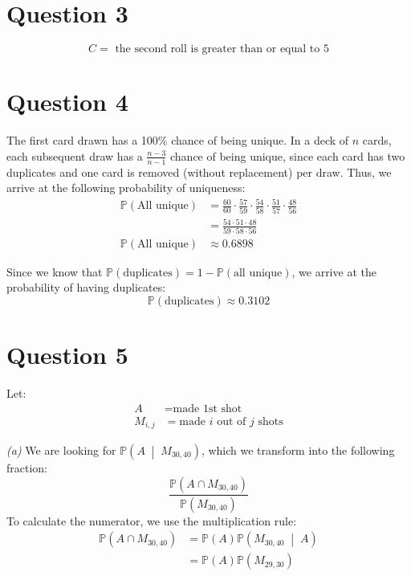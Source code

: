 \documentclass[titlepage, 12pt, leqno]{article}
\begin{document}
\pagebreak
\section{Question 3}
\[
    \boxed{C = \text{ the second roll is greater than or equal to 5}} 
\]
\pagebreak
\section{Question 4}
The first card drawn has a 100\% chance of being unique. In a deck of $n$ cards, each subsequent draw has a $\frac{n-3}{n-1}$ chance of being unique, since each card has two duplicates and one card is removed (without replacement) per draw. Thus, we arrive at the following probability of uniqueness:
\begin{align*}
    \mathbb{P}(\text{All unique}) &= \frac{60}{60} \cdot \frac{57}{59} \cdot \frac{54}{58} \cdot \frac{51}{57} \cdot \frac{48}{56} \\
                                  &= \frac{54 \cdot 51 \cdot 48}{59 \cdot 58 \cdot 56} \\
    \mathbb{P}(\text{All unique}) &\approx 0.6898
\end{align*}

Since we know that $\mathbb{P}(\text{duplicates}) = 1 - \mathbb{P}(\text{all unique})$, we arrive at the probability of having duplicates:
\[
    \boxed{\mathbb{P}(\text{duplicates}) \approx 0.3102}
\]
\pagebreak
\section{Question 5}

Let:
\begin{align*}
    A &= \text{made 1st shot} \\
    M_{i,j} &= \text{made } i \text{ out of } j \text{ shots}
\end{align*}

\textit{(a)} 
We are looking for $ \mathbb{P}\left(A \;\middle|\; M_{30,40}\right) $, which we transform into the following fraction:
\[
    \frac{\mathbb{P}(A \cap M_{30,40})}{\mathbb{P}(M_{30,40})} 
\]
To calculate the numerator, we use the multiplication rule:
\begin{align*}
    \mathbb{P}(A \cap M_{30,40}) &= \mathbb{P}(A) \mathbb{P}\left(M_{30,40} \;\middle|\; A\right) \\
                                 &= \mathbb{P}(A)\mathbb{P}(M_{29,30})
\end{align*}
\end{document}
